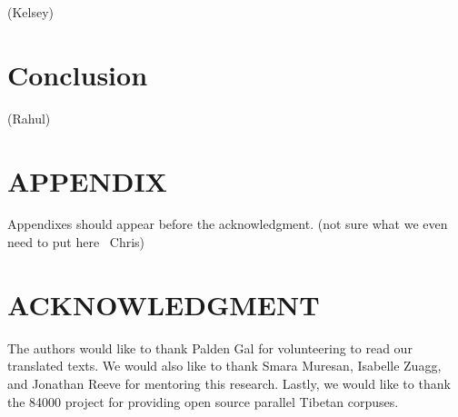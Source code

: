 \documentclass[letterpaper, 10 pt, conference]{ieeeconf}  %
\begin{document}
(Kelsey)



\section{Conclusion}


(Rahul)


\section*{APPENDIX}

Appendixes should appear before the acknowledgment. (not sure what we even need to put here ~Chris)

\section*{ACKNOWLEDGMENT}

The authors would like to thank Palden Gal for volunteering to read our translated texts. We would also like to thank Smara Muresan, Isabelle Zuagg, and Jonathan Reeve for mentoring this research. Lastly, we would like to thank the 84000 project for providing open source parallel Tibetan corpuses. 
\end{document}
